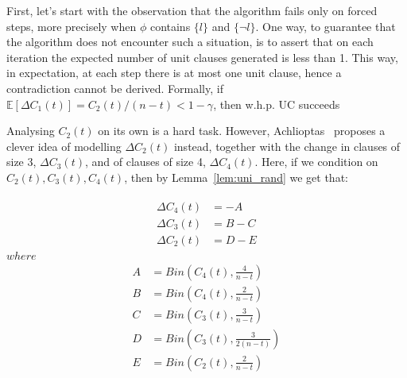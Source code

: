 \documentclass[10pt]{article}
\begin{document}
First, let's start with the observation that the algorithm fails only on forced steps, more precisely when $\phi$ contains $\{ l \}$ and $\{ \neg l \}$. One way, to guarantee that the algorithm does not encounter such a situation, is to assert that on each iteration the
expected number of unit clauses generated is less than 1. This way, in expectation, at each step there is at most one unit clause, hence a contradiction cannot be derived.
Formally, if $\mathbb{E}[\Delta C_1(t)] = C_2(t)/(n - t) < 1 - \gamma $, then w.h.p. UC succeeds
\par 
Analysing $C_2(t)$ on its own is a hard task. However, Achlioptas~\cite{satdiffeq} proposes a clever idea of modelling $\Delta C_2(t)$ instead, together with the change in clauses of size 3, $\Delta C_3(t)$, and of clauses of size 4, $\Delta C_4(t)$. Here, if we condition on $C_2(t), C_3(t), C_4(t)$, then by Lemma~\ref{lem:uni_rand} we get that:

\begin{align}\begin{split}
    \Delta C_4(t) &= - A
\\
    \Delta C_3(t) &= B - C
\\
    \Delta C_2(t) &= D - E
\end{split} \end{align}
$where$
\begin{align}
\begin{split}
    A &= Bin(C_4(t), \frac{4}{n - t})\\
    B &= Bin(C_4(t), \frac{2}{n - t})\\
    C &= Bin(C_3(t), \frac{3}{n - t})\\
    D &= Bin(C_3(t), \frac{3}{2(n - t)})\\
    E &= Bin(C_2(t), \frac{2}{n-t})
\end{split}
\end{align}
\end{document}
